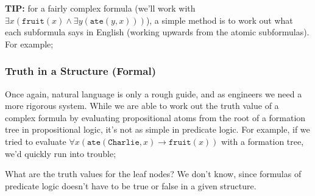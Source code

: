 \documentclass[a4paper, 12pt]{article}
\begin{document}
        \textbf{TIP:} for a fairly complex formula (we'll work with $\exists x (\texttt{fruit}(x) \land \exists y (\texttt{ate}(y, x)))$), a simple method is to work out what each subformula says in English (working upwards from the atomic subformulas). For example;
        \begin{center}
        \end{center}
        \subsubsection*{Truth in a Structure (Formal)}
        Once again, natural language is only a rough guide, and as engineers we need a more rigorous system. While we are able to work out the truth value of a complex formula by evaluating propositional atoms from the root of a formation tree in propositional logic, it's not as simple in predicate logic. For example, if we tried to evaluate $\forall x (\texttt{ate}(\texttt{Charlie}, x) \rightarrow \texttt{fruit}(x))$ with a formation tree, we'd quickly run into trouble;
        \begin{center}
        \end{center}
        What are the truth values for the leaf nodes? We don't know, since formulas of predicate logic doesn't have to be true or false in a given structure.
        \medskip
\end{document}
